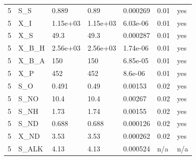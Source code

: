 \begin{table}[t]
\begin{tabular}{lllllll}
5 & S\_S & 0.889 & 0.89 & 0.000269 & 0.01 & yes \\
5 & X\_I & 1.15e+03 & 1.15e+03 & 6.03e-06 & 0.01 & yes \\
5 & X\_S & 49.3 & 49.3 & 0.000287 & 0.01 & yes \\
5 & X\_B\_H & 2.56e+03 & 2.56e+03 & 1.74e-06 & 0.01 & yes \\
5 & X\_B\_A & 150 & 150 & 6.85e-05 & 0.01 & yes \\
5 & X\_P & 452 & 452 & 8.6e-06 & 0.01 & yes \\
5 & S\_O & 0.491 & 0.49 & 0.00153 & 0.02 & yes \\
5 & S\_NO & 10.4 & 10.4 & 0.00267 & 0.02 & yes \\
5 & S\_NH & 1.73 & 1.74 & 0.00155 & 0.02 & yes \\
5 & S\_ND & 0.688 & 0.688 & 0.000126 & 0.02 & yes \\
5 & X\_ND & 3.53 & 3.53 & 0.000262 & 0.02 & yes \\
5 & S\_ALK & 4.13 & 4.13 & 0.000524 & n/a & n/a \\
\bottomrule
\end{tabular}
\end{table}
